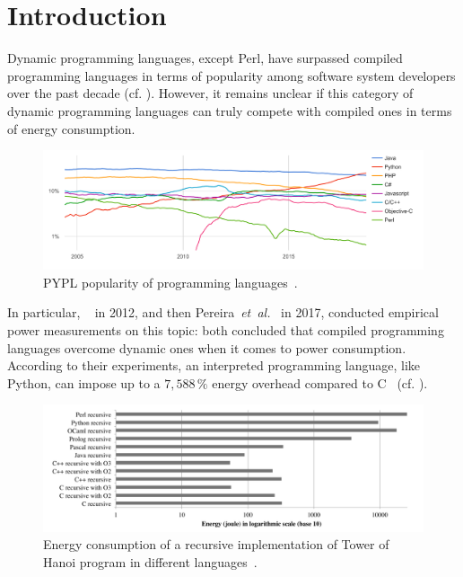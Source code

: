 
\section{Introduction}
Dynamic programming languages, except Perl, have surpassed compiled programming languages in terms of popularity among software system developers over the past decade (cf. ).
However, it remains unclear if this category of dynamic programming languages can truly compete with compiled ones in terms of energy consumption.

\begin{figure}[!htb]
    \includegraphics[width=\linewidth]{imgs/programminglanguangespopularity.png}
    \caption{PYPL popularity of programming languages~\cite{noauthor_pypl_2018}.}
    \label{fig:pypl}
\end{figure}

In particular, \citeauthor{noureddine_preliminary_2012}~\cite{noureddine_preliminary_2012} in 2012, and then Pereira~\emph{et~al.}~\cite{pereira_energy_2017} in 2017, conducted empirical power measurements on this topic: both concluded that compiled programming languages overcome dynamic ones when it comes to power consumption.
According to their experiments, an interpreted programming language, like Python, can impose up to a $7,588\,\%$ energy overhead compared to C~\cite{pereira_energy_2017} (cf. ).

\begin{figure}[!htb]
    \includegraphics[width=\linewidth]{imgs/hannoiimplementation.png}
    \caption{Energy consumption of a recursive implementation of Tower of Hanoi program in different languages~\cite{noureddine_preliminary_2012}.}
    \label{fig:hannoi}
\end{figure}

